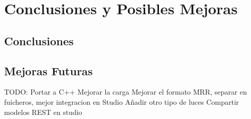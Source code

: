 
\chapter{Conclusiones y Posibles Mejoras} %

\label{Chapter5} %



\section{Conclusiones}

\section{Mejoras Futuras}
TODO: 
Portar a C++
Mejorar la carga
Mejorar el formato MRR, separar en fuicheros, mejor integracion en Studio
Añadir otro tipo de luces
Compartir modelos
REST en studio
